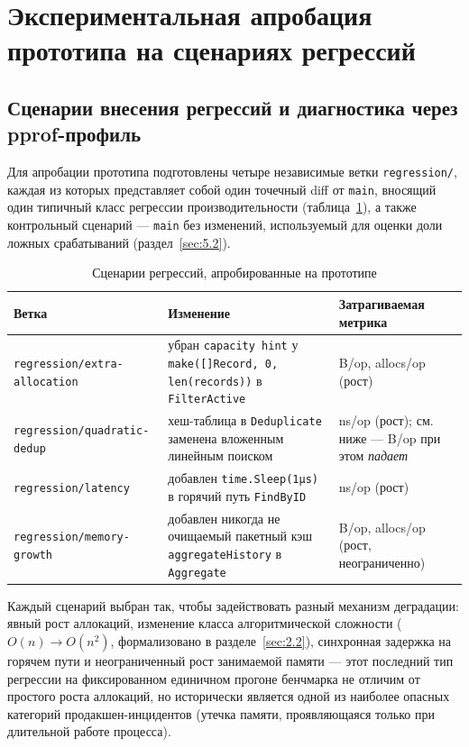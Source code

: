 \documentclass[12pt,a4paper]{article}
\newcommand{\newrazdel}{\clearpage}
\numberwithin{equation}{section}
\begin{document}
\newrazdel
\section{Экспериментальная апробация прототипа на сценариях регрессий}
\label{sec:razdel5}

\subsection{Сценарии внесения регрессий и диагностика через pprof-профиль}
\label{sec:5.1}

Для апробации прототипа подготовлены четыре независимые ветки
\texttt{regression/\allowbreak *}, каждая из которых представляет собой один точечный
diff от \texttt{main}, вносящий один типичный класс регрессии
производительности (таблица~\ref{tab:5.1}), а также контрольный сценарий —
\texttt{main} без изменений, используемый для оценки доли ложных
срабатываний (раздел~\ref{sec:5.2}).

\begin{table}[htbp]
\caption{Сценарии регрессий, апробированные на прототипе}
\label{tab:5.1}
\centering
\begin{tabular}{p{3.4cm}p{5.5cm}p{4.8cm}}
\toprule
Ветка & Изменение & Затрагиваемая метрика \\
\midrule
\texttt{regression/\allowbreak extra-\allowbreak allocation} & убран \texttt{capacity hint} у \texttt{make([]Record, 0, len(records))} в \texttt{FilterActive} & B/op, allocs/op (рост) \\
\texttt{regression/\allowbreak quadratic-\allowbreak dedup} & хеш-таблица в \texttt{Deduplicate} заменена вложенным линейным поиском & ns/op (рост); см. ниже — B/op при этом \emph{падает} \\
\texttt{regression/\allowbreak latency} & добавлен \texttt{time.Sleep(1μs)} в горячий путь \texttt{FindByID} & ns/op (рост) \\
\texttt{regression/\allowbreak memory-\allowbreak growth} & добавлен никогда не очищаемый пакетный кэш \texttt{aggregateHistory} в \texttt{Aggregate} & B/op, allocs/op (рост, неограниченно) \\
\bottomrule
\end{tabular}
\end{table}

Каждый сценарий выбран так, чтобы задействовать разный механизм деградации:
явный рост аллокаций, изменение класса алгоритмической сложности
($O(n) \to O(n^2)$, формализовано в разделе~\ref{sec:2.2}), синхронная
задержка на горячем пути и неограниченный рост занимаемой памяти — этот
последний тип регрессии на фиксированном единичном прогоне бенчмарка не
отличим от простого роста аллокаций, но исторически является одной из
наиболее опасных категорий продакшен-инцидентов (утечка памяти,
проявляющаяся только при длительной работе процесса).
\end{document}
